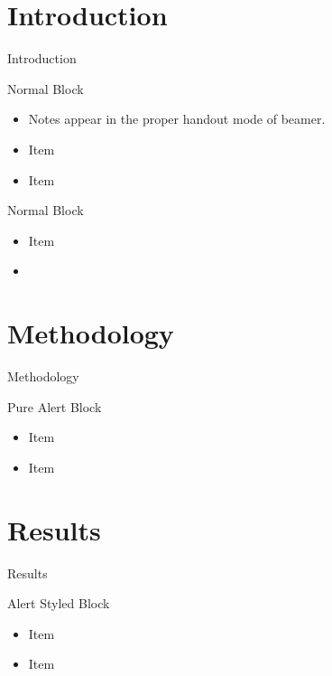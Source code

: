 \usepackage{lipsum}

\maketitle

\mode*

\section{Introduction}

\begin{frame}{Introduction}
  \begin{block}{Normal Block}
    \begin{itemize}
    \item Notes appear in the proper handout mode of beamer.
    \item Item
    \item Item
    \end{itemize}
  \end{block}

  \begin{block}{Normal Block}
    \begin{itemize}
    \item Item
    \item {}
    \end{itemize}
  \end{block}
\end{frame}

\lipsum[1]

\section{Methodology}

\begin{frame}{Methodology}
  \begin{alert}{Pure Alert Block}
    \begin{itemize}
    \item Item
    \item Item
    \end{itemize}
  \end{alert}
\end{frame}

\lipsum[2-4]

\section{Results}
\begin{frame}{Results}
  \begin{alertblock}{Alert Styled Block}
    \begin{itemize}
    \item Item
    \item Item
    \end{itemize}
  \end{alertblock}
\end{frame}

